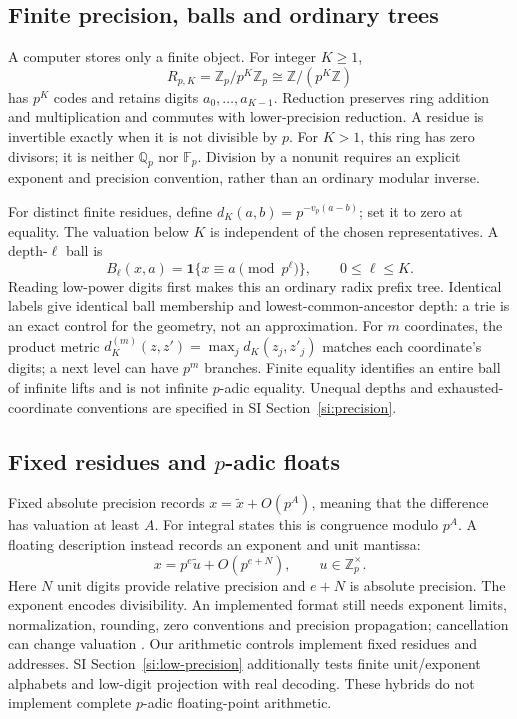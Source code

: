 \documentclass[11pt]{article}
\newcommand{\Z}{\mathbb{Z}}
\newcommand{\F}{\mathbb{F}}
\newcommand{\ind}{\mathbf{1}}
\newcommand{\vp}{v_p}
\newcommand{\RpK}{R_{p,K}}
\newcommand{\Qp}{\mathbb{Q}_p}
\newcommand{\Zp}{\mathbb{Z}_p}
\begin{document}
\subsection{Finite precision, balls and ordinary trees}

A computer stores only a finite object. For integer \(K\geq1\),
\[
 \RpK=\Zp/p^K\Zp\cong\Z/(p^K\Z)
\]
has \(p^K\) codes and retains digits \(a_0,\ldots,a_{K-1}\).
Reduction preserves ring addition and multiplication and commutes with
lower-precision reduction. A residue is invertible exactly when it is not
divisible by \(p\). For \(K>1\), this ring has zero divisors; it is neither
\(\Qp\) nor \(\F_p\). Division by a nonunit requires an explicit exponent
and precision convention, rather than an ordinary modular inverse.

For distinct finite residues, define \(d_K(a,b)=p^{-\vp(a-b)}\); set it
to zero at equality. The valuation below \(K\) is independent of the chosen
representatives. A depth-\(\ell\) ball is
\begin{equation}
 B_\ell(x,a)=\ind\{x\equiv a\pmod{p^\ell}\},\qquad0\leq\ell\leq K.
 \label{eq:ball}
\end{equation}
Reading low-power digits first makes this an ordinary radix prefix tree.
Identical labels give identical ball membership and lowest-common-ancestor
depth: a trie is an exact control for the geometry, not an approximation.
For \(m\) coordinates, the product metric
\(d_K^{(m)}(z,z')=\max_jd_K(z_j,z'_j)\) matches each coordinate's digits;
a next level can have \(p^m\) branches. Finite equality identifies an entire
ball of infinite lifts and is not infinite \(p\)-adic equality.
Unequal depths and exhausted-coordinate conventions are specified in SI
Section~\ref{si:precision}.

\subsection{Fixed residues and \texorpdfstring{\(p\)}{p}-adic floats}

Fixed absolute precision records \(x=\widetilde x+O(p^A)\), meaning that
the difference has valuation at least \(A\). For integral states this is
congruence modulo \(p^A\). A floating description instead records an exponent
and unit mantissa:
\[
 x=p^e\widetilde u+O(p^{e+N}),\qquad u\in\Zp^\times.
\]
Here \(N\) unit digits provide relative precision and \(e+N\) is absolute
precision. The exponent encodes divisibility. An implemented format still
needs exponent limits, normalization, rounding, zero conventions and
precision propagation; cancellation can change valuation
\citep{caruso2017computations}. Our arithmetic controls implement fixed residues and addresses.
SI Section~\ref{si:low-precision} additionally tests finite unit/exponent
alphabets and low-digit projection with real decoding. These hybrids do not
implement complete \(p\)-adic floating-point arithmetic.
\end{document}

